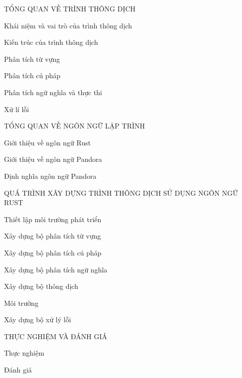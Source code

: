 \documentclass[11pt,a4paper]{article}
\begin{document}
    \begin{mucluc}
        \item TỔNG QUAN VỀ TRÌNH THÔNG DỊCH
        \begin{mucluc}
            \item Khái niệm và vai trò của trình thông dịch
            \item Kiến trúc của trình thông dịch
            \begin{mucluc}
                \item Phân tích từ vựng
                \item Phân tích cú pháp
                \item Phân tích ngữ nghĩa và thực thi
                \item Xử lí lỗi
            \end{mucluc}
        \end{mucluc}
        \item TỔNG QUAN VỀ NGÔN NGỮ LẬP TRÌNH
        \begin{mucluc}
            \item Giới thiệu về ngôn ngữ Rust
            \item Giới thiệu về ngôn ngữ Pandora
            \item Định nghĩa ngôn ngữ Pandora
        \end{mucluc}
        \item QUÁ TRÌNH XÂY DỰNG TRÌNH THÔNG DỊCH SỬ DỤNG NGÔN NGỮ RUST
        \begin{mucluc}
            \item Thiết lập môi trường phát triển
            \item Xây dựng bộ phân tích từ vựng
            \item Xây dựng bộ phân tích cú pháp 
            \item Xây dựng bộ phân tích ngữ nghĩa
            \item Xây dựng bộ thông dịch
            \item Môi trường
            \item Xây dựng bộ xử lý lỗi
        \end{mucluc}
        \item THỰC NGHIỆM VÀ ĐÁNH GIÁ
        \begin{mucluc}
            \item Thực nghiệm
            \item Đánh giá
        \end{mucluc}
    \end{mucluc}
\end{document}
